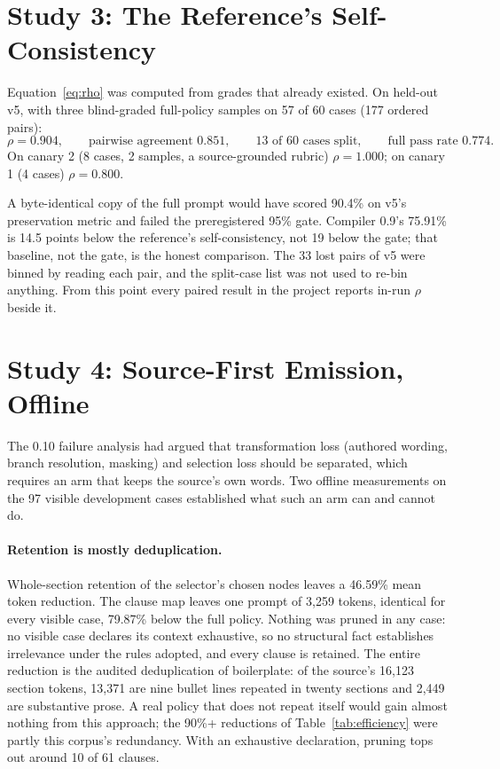 \documentclass[11pt]{article}
\begin{document}
\section{Study 3: The Reference's Self-Consistency}
\label{sec:noisefloor}

Equation~\ref{eq:rho} was computed from grades that already existed. On held-out v5, with three blind-graded full-policy samples on 57 of 60 cases (177 ordered pairs):
\begin{equation*}
  \rho = 0.904, \qquad \text{pairwise agreement } 0.851, \qquad 13 \text{ of } 60 \text{ cases split}, \qquad \text{full pass rate } 0.774.
\end{equation*}
On canary 2 (8 cases, 2 samples, a source-grounded rubric) $\rho = 1.000$; on canary 1 (4 cases) $\rho = 0.800$.

A byte-identical copy of the full prompt would have scored 90.4\% on v5's preservation metric and failed the preregistered 95\% gate. Compiler 0.9's 75.91\% is 14.5 points below the reference's self-consistency, not 19 below the gate; that baseline, not the gate, is the honest comparison. The 33 lost pairs of v5 were binned by reading each pair, and the split-case list was not used to re-bin anything. From this point every paired result in the project reports in-run $\rho$ beside it.

\section{Study 4: Source-First Emission, Offline}
\label{sec:sourcefirst}

The 0.10 failure analysis had argued that transformation loss (authored wording, branch resolution, masking) and selection loss should be separated, which requires an arm that keeps the source's own words. Two offline measurements on the 97 visible development cases established what such an arm can and cannot do.

\paragraph{Retention is mostly deduplication.} Whole-section retention of the selector's chosen nodes leaves a 46.59\% mean token reduction. The clause map leaves one prompt of 3{,}259 tokens, identical for every visible case, 79.87\% below the full policy. Nothing was pruned in any case: no visible case declares its context exhaustive, so no structural fact establishes irrelevance under the rules adopted, and every clause is retained. The entire reduction is the audited deduplication of boilerplate: of the source's 16{,}123 section tokens, 13{,}371 are nine bullet lines repeated in twenty sections and 2{,}449 are substantive prose. A real policy that does not repeat itself would gain almost nothing from this approach; the 90\%+ reductions of Table~\ref{tab:efficiency} were partly this corpus's redundancy. With an exhaustive declaration, pruning tops out around 10 of 61 clauses.
\end{document}
